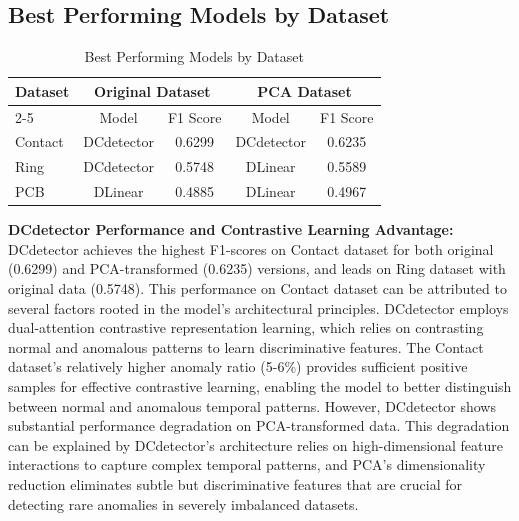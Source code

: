 \subsection{Best Performing Models by Dataset}

\begin{table}[htbp]
    \centering
    \caption{Best Performing Models by Dataset}
    \begin{tabular}{l|cc|cc}
        \hline
        \multirow{2}{*}{Dataset} & \multicolumn{2}{c|}{Original Dataset} & \multicolumn{2}{c}{PCA Dataset} \\
        \cline{2-5}
        & Model & F1 Score & Model & F1 Score \\
        \hline
        Contact & DCdetector & 0.6299 & DCdetector & 0.6235 \\
        Ring    & DCdetector & 0.5748 & DLinear & 0.5589 \\
        PCB     & DLinear & 0.4885 & DLinear & 0.4967 \\
        \hline
    \end{tabular}
    \label{tab:best_models}
\end{table}

\textbf{DCdetector Performance and Contrastive Learning Advantage:}
DCdetector achieves the highest F1-scores on Contact dataset for both original (0.6299) and PCA-transformed (0.6235) versions, and leads on Ring dataset with original data (0.5748). This performance on Contact dataset can be attributed to several factors rooted in the model's architectural principles. DCdetector employs dual-attention contrastive representation learning, which relies on contrasting normal and anomalous patterns to learn discriminative features. The Contact dataset's relatively higher anomaly ratio (5-6\%) provides sufficient positive samples for effective contrastive learning, enabling the model to better distinguish between normal and anomalous temporal patterns. However, DCdetector shows substantial performance degradation on PCA-transformed data. This degradation can be explained by DCdetector's architecture relies on high-dimensional feature interactions to capture complex temporal patterns, and PCA's dimensionality reduction eliminates subtle but discriminative features that are crucial for detecting rare anomalies in severely imbalanced datasets.

